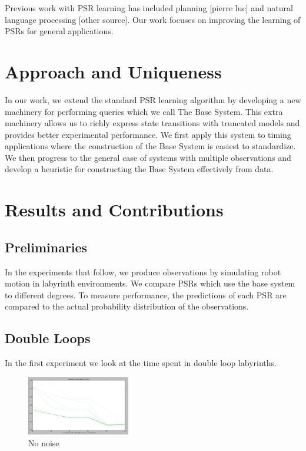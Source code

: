 \documentclass{acm_proc_article-sp}
\begin{document}
Previous work with PSR learning has included planning [pierre luc] and natural language processing [other source]. Our work focuses on improving the learning of PSRs for general applications.

\section{Approach and Uniqueness} 

In our work, we extend the standard PSR learning algorithm by developing a new machinery for performing queries which we call The Base System. This extra machinery allows us to  richly express state transitions with truncated models and provides better experimental performance. We first apply this system to timing applications where the construction of the Base System is easiest to standardize. We then progress to the general case of systems with multiple observations and develop a heuristic for constructing the Base System effectively from data.

\section{Results and Contributions}

\subsection{Preliminaries}
In the experiments that follow, we produce observations by simulating robot motion in labyrinth environments. We compare PSRs which use the base system to different degrees. To measure performance, the predictions of each PSR are compared to the actual probability distribution of the observations. 


\subsection{Double Loops}

In the first experiment we look at the time spent in double loop labyrinths. 

\begin{figure}[ht!]
\centering
\includegraphics[width=45mm]{lucasplots/doubleloop0.png}
\caption{No noise \label{overflow}}
\end{figure}
\end{document}
